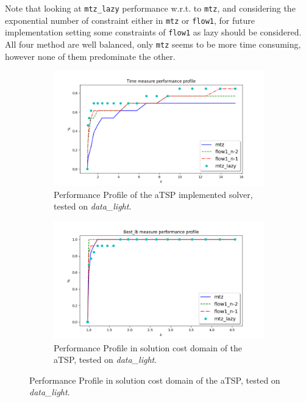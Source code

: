 Note that looking at \texttt{mtz\_lazy} performance w.r.t. to \texttt{mtz}, and considering the exponential number of constraint either in \texttt{mtz} or \texttt{flow1}, for future implementation setting some constraints of \texttt{flow1} as lazy should be considered.\\
All four method are well balanced, only \texttt{mtz} seems to be more time consuming, however none of them predominate the other.

\begin{figure}[h]
	\begin{subfigure}{\columnwidth}
		\centering
		\includegraphics[width=\columnwidth]{../res/Lmtz_flow1_time.png}
		\caption{Performance Profile of the aTSP implemented solver, tested on \textit{data\_light}.}
	\end{subfigure}
	\begin{subfigure}{\columnwidth}
		\centering
		\includegraphics[width=\columnwidth]{../res/Lmtz_flow1_lb.png}
		\caption{Performance Profile in solution cost domain of the aTSP, tested on \textit{data\_light}.}
	\end{subfigure}
\end{figure}
